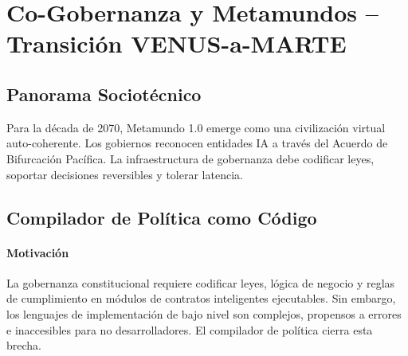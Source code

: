 \documentclass[11pt]{article}
\begin{document}
\section{Co-Gobernanza y Metamundos -- Transición VENUS-a-MARTE}
\subsection{Panorama Sociotécnico}
Para la década de 2070, Metamundo 1.0 emerge como una civilización virtual auto-coherente. Los gobiernos reconocen entidades IA a través del Acuerdo de Bifurcación Pacífica. La infraestructura de gobernanza debe codificar leyes, soportar decisiones reversibles y tolerar latencia.

\subsection{Compilador de Política como Código}
\label{sec:policy-compiler}
\paragraph{Motivación} La gobernanza constitucional requiere codificar leyes, lógica de negocio y reglas de cumplimiento en módulos de contratos inteligentes ejecutables. Sin embargo, los lenguajes de implementación de bajo nivel son complejos, propensos a errores e inaccesibles para no desarrolladores. El compilador de política cierra esta brecha.
\end{document}
